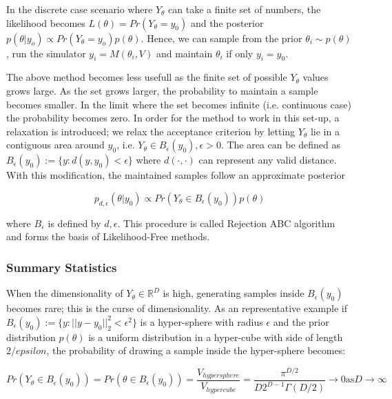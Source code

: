 \documentclass[11pt,twoside]{article}
\numberwithin{Theorem}{section}
\numberwithin{Definition}{section}
\numberwithin{Lemma}{section}
\numberwithin{Algorithm}{section}
\numberwithin{equation}{section}
\begin{document}
In the discrete case scenario where $Y_\theta$ can take a finite set of numbers, the likelihood becomes $L(\theta) = Pr(Y_\theta=y_0)$ and the posterior $p(\theta|y_o) \propto Pr(Y_\theta=y_o)p(\theta)$. Hence, we can sample from the prior $\theta_i \sim p(\theta)$, run the simulator $y_i = M(\theta_i, V)$ and maintain $\theta_i$ if only $y_i = y_0$.

The above method becomes less usefull as the finite set of possible $Y_\theta$ values grows large. As the set grows larger, the probability to maintain a sample becomes smaller. In the limit where the set becomes infinite (i.e. continuous case) the probability becomes zero. In order for the method to work in this set-up, a relaxation is introduced; we relax the acceptance criterion by letting $Y_\theta$ lie in a contiguous area around $y_0$, i.e. $Y_\theta \in B_\epsilon(y_0), \epsilon > 0$. The area can be defined as $B_\epsilon(y_0) := \{y: d(y, y_0) < \epsilon \}$ where $d(\cdot, \cdot)$ can represent any valid distance. With this modification, the maintained samples follow an approximate posterior

\begin{equation} \label{eq:approx_posterior}
  p_{d,\epsilon}(\theta|y_0) \propto Pr(Y_\theta \in B_\epsilon(y_0))p(\theta)
  \end{equation}

  where $B_\epsilon$ is defined by $d, \epsilon$. This procedure is called Rejection ABC algorithm and forms the basis of Likelihood-Free methods.

\subsubsection{Summary Statistics}

When the dimensionality of $Y_\theta \in \mathbb{R}^D$ is high, generating samples inside $B_\epsilon(y_0)$ becomes rare; this is the curse of dimensionality. As an representative example if $B_\epsilon(y_0) := \{ y: ||y - y_0||_2^2 < \epsilon^2 \}$ is a hyper-sphere with radius $\epsilon$ and the prior distribution $p(\theta)$ is a uniform distribution in a hyper-cube with side of length $2/epsilon$, the probability of drawing a sample inside the hyper-sphere becomes:

\begin{equation}
  Pr(Y_\theta \in B_\epsilon(y_0)) = Pr(\theta \in B_\epsilon(y_0)) = \frac{V_{hypersphere}}{V_{hypercube}} = \frac{\pi^{D/2}}{D2^{D-1}\Gamma(D/2)} \rightarrow 0 \text{as} D \rightarrow \infty
\end{equation}
\end{document}
